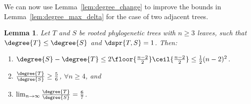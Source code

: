 \documentclass{amsart}
\newtheorem{lemma}[theorem]{Lemma}
\begin{document}
We can now use Lemma~\ref{lem:degree_change} to improve the bounds in Lemma~\ref{lem:degree_max_delta} for the case of two adjacent trees.
\begin{lemma}
	\label{lem:degree_max_delta_adjacent}
	Let $T$ and $S$ be rooted phylogenetic trees with $n \ge 3$ leaves, such that $\degree{T} \le \degree{S}$ and $\dspr{T,S} = 1$.
	Then:
	\begin{enumerate}
		\item $\degree{S} - \degree{T} \le 2\floor{\frac{n-2}{2}}\ceil{\frac{n-2}{2}} \le \frac{1}{2} (n-2)^2 $.
		\item $\frac{\degree{T}}{\degree{S}} \ge \frac{5}{6}$, $\forall n \ge 4$, and
		\item $\lim_{n\rightarrow\infty}\frac{\degree{T}}{\degree{S}} =  \frac{6}{7}$.
	\end{enumerate}
\end{lemma}
\end{document}
